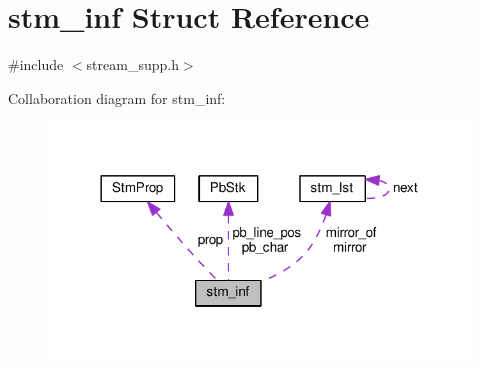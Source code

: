 \hypertarget{structstm__inf}{}\section{stm\+\_\+inf Struct Reference}
\label{structstm__inf}


{\ttfamily \#include $<$stream\+\_\+supp.\+h$>$}



Collaboration diagram for stm\+\_\+inf\+:\nopagebreak
\begin{figure}[H]
\begin{center}
\leavevmode
\includegraphics[width=318pt]{structstm__inf__coll__graph}
\end{center}
\end{figure}
